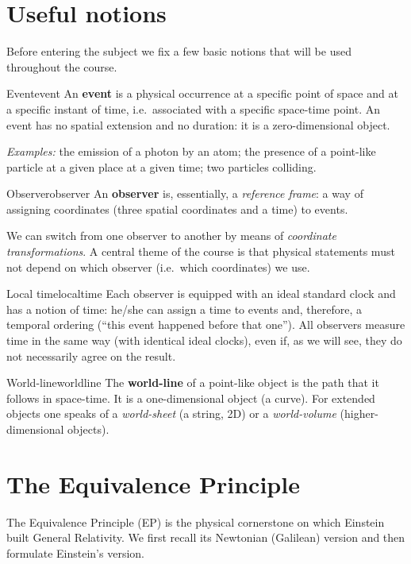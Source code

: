 \section{Useful notions}

Before entering the subject we fix a few basic notions that will be used throughout the course.

\begin{definition}{Event}{event}
An \textbf{event} is a physical occurrence at a specific point of space and at a specific instant of time, i.e.\ associated with a specific space-time point.
An event has no spatial extension and no duration: it is a zero-dimensional object.
\end{definition}
\textit{Examples:} the emission of a photon by an atom; the presence of a point-like particle at a given place at a given time; two particles colliding.

\begin{definition}{Observer}{observer}
An \textbf{observer} is, essentially, a \emph{reference frame}: a way of assigning coordinates (three spatial coordinates and a time) to events.
\end{definition}
We can switch from one observer to another by means of \emph{coordinate transformations}. A central theme of the course is that physical statements must not depend on which observer (i.e.\ which coordinates) we use.

\begin{definition}{Local time}{localtime}
Each observer is equipped with an ideal standard clock and has a notion of time: he/she can assign a time to events and, therefore, a temporal ordering (``this event happened before that one'').
All observers measure time in the same way (with identical ideal clocks), even if, as we will see, they do not necessarily agree on the result.
\end{definition}

\begin{definition}{World-line}{worldline}
The \textbf{world-line} of a point-like object is the path that it follows in space-time. It is a one-dimensional object (a curve).
For extended objects one speaks of a \emph{world-sheet} (a string, 2D) or a \emph{world-volume} (higher-dimensional objects).
\end{definition}

\section{The Equivalence Principle}
The Equivalence Principle (EP) is the physical cornerstone on which Einstein built General Relativity. We first recall its Newtonian (Galilean) version and then formulate Einstein's version.

